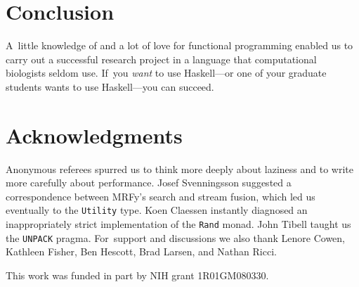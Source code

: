 \documentclass[]{jfp1}
\newcommand\mrfy{MRFy} %
\begin{document}
\section{Conclusion}

A~little knowledge of and a lot of love for functional programming
enabled us to carry out a successful research project in a language
that computational biologists seldom use.
If~you \emph{want} to use Haskell---or one of your graduate students
wants to use Haskell---you can
succeed. 




%  

 

\section*{Acknowledgments}

Anonymous referees spurred us to think
more deeply about laziness and to write more carefully about performance.
Josef Svenningsson suggested a correspondence between \mrfy's search
and stream fusion, which led us eventually to the \texttt{Utility} type.
Koen Claessen instantly diagnosed an inappropriately strict
implementation of the \texttt{Rand} monad.
John Tibell taught us the \texttt{UNPACK} pragma.
For~support and discussions 
we also thank Lenore Cowen, Kathleen Fisher, Ben Hescott, Brad
Larsen, and Nathan Ricci.

This work was funded in part by NIH grant 1R01GM080330.



%









\end{document}
